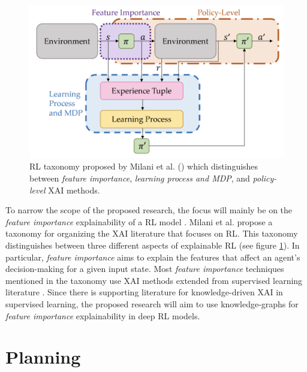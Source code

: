 \documentclass[11pt]{article}
\begin{document}
\begin{figure}[ht]
  \includegraphics[width=\linewidth]{images/rl_taxonomy.png}
  \caption{RL taxonomy proposed by Milani et al. (\citeyear{Milani2022}) which distinguishes between \textit{feature importance}, \textit{learning process and MDP}, and \textit{policy-level} XAI methods.}
  \label{fig:rl_taxonomy}
\end{figure}
To narrow the scope of the proposed research, the focus will mainly be on the \textit{feature importance} explainability of a RL model \cite{Milani2022}.
Milani et al. propose a taxonomy for organizing the XAI literature that focuses on RL. This taxonomy distinguishes between three different aspects of explainable RL (see figure \ref{fig:rl_taxonomy}).
In particular, \textit{feature importance} aims to explain the features that affect an agent's decision-making for a given input state.
Most \textit{feature importance} techniques mentioned in the taxonomy use XAI methods extended from supervised learning literature \cite{greydanus_visualizing_2018,goel_unsupervised_2018,ehsan_rationalization_2017}. 
Since there is supporting literature for knowledge-driven XAI in supervised learning, the proposed research will aim to use knowledge-graphs for \textit{feature importance} explainability in deep RL models.




\section{Planning}
\end{document}
